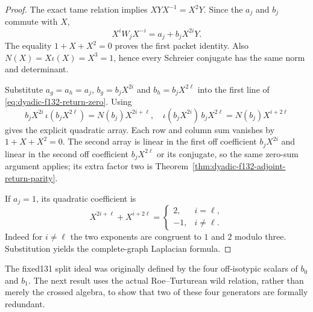 \documentclass[11pt]{article}
\theoremstyle{definition}
\begin{document}
\begin{proof}
The exact tame
relation implies
$XYX^{-1}=X^2Y$.
Since the $a_j$
and $b_j$ commute
with $X$,
\[
X^iW_jX^{-i}
=a_j+b_jX^{2i}Y.
\]
The equality
$1+X+X^2=0$
proves the first
packet identity.
Also $N(X)=X\iota(X)=X^3=1$,
hence every Schreier
conjugate has the same
norm and determinant.

Substitute
$a_g=a_h=a_j$,
$b_g=b_jX^{2i}$ and
$b_h=b_jX^{2\ell}$
into the first line of
\eqref{eq:dyadic-f132-return-zero}.
Using
\[
b_jX^{2i}\,\iota(b_jX^{2\ell})
=N(b_j)X^{2i+\ell},
\quad
\iota(b_jX^{2i})\,b_jX^{2\ell}
=N(b_j)X^{i+2\ell}
\]
gives the
explicit quadratic array.
Each row and column
sum vanishes by
$1+X+X^2=0$.
The second array
is linear in the
first off coefficient
$b_jX^{2i}$ and
linear in the
second off coefficient
$b_jX^{2\ell}$
or its conjugate,
so the same zero-sum
argument applies;
its extra factor
two is
Theorem~\ref{thm:dyadic-f132-adjoint-return-parity}.

If $a_j=1$, its
quadratic coefficient
is
\[
X^{2i+\ell}+X^{i+2\ell}
=
\begin{cases}
2,&i=\ell,\\
-1,&i\ne\ell.
\end{cases}
\]
Indeed for $i\ne\ell$
the two exponents
are congruent to
$1$ and $2$ modulo
three.  Substitution
yields the complete-graph
Laplacian formula.
\end{proof}

The fixed131 split
ideal was originally
defined by the four
off-isotypic scalars of
$b_0$ and $b_1$.
The next result uses
the actual Roe--Turturean
wild relation, rather
than merely the crossed
algebra, to show that
two of these four
generators are formally
redundant.
\end{document}
